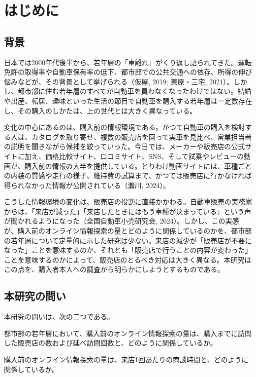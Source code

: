 \section{はじめに}

\subsection{背景}

日本では2000年代後半から、若年層の「車離れ」がくり返し語られてきた。運転免許の取得率や自動車保有率の低下、都市部での公共交通への依存、所得の伸び悩みなどが、その背景として挙げられる（仮屋, 2019; 東原・三宅, 2021）。しかし、都市部に住む若年層のすべてが自動車を買わなくなったわけではない。結婚や出産、転居、趣味といった生活の節目で自動車を購入する若年層は一定数存在し、その購入のしかたは、上の世代とは大きく異なっている。

変化の中心にあるのは、購入前の情報環境である。かつて自動車の購入を検討する人は、カタログを取り寄せ、複数の販売店を回って実車を見比べ、営業担当者の説明を聞きながら候補を絞っていった。今日では、メーカーや販売店の公式サイトに加え、価格比較サイト、口コミサイト、SNS、そして試乗やレビューの動画が、購入前の情報の大半を提供している。とりわけ動画サイトには、車種ごとの内装の質感や走行の様子、維持費の試算まで、かつては販売店に行かなければ得られなかった情報が公開されている（瀬川, 2024）。

こうした情報環境の変化は、販売店の役割に直接かかわる。自動車販売の実務家からは、「来店が減った」「来店したときにはもう車種が決まっている」という声が聞かれるようになった（全国自動車小売研究会, 2024）。しかし、この実感が、購入前のオンライン情報探索の量とどのように関係しているのかを、都市部の若年層について定量的に示した研究は少ない。来店の減少が「販売店が不要になった」ことを意味するのか、それとも「販売店で行うことの内容が変わった」ことを意味するのかによって、販売店のとるべき対応は大きく異なる。本研究はこの点を、購入者本人への調査から明らかにしようとするものである。

\subsection{本研究の問い}

本研究の問いは、次の二つである。

\begin{description}[style=nextline,leftmargin=2\zw,labelsep=0.5\zw,font=\normalfont\bfseries,itemsep=2pt]
  \item[RQ1] 都市部の若年層において、購入前のオンライン情報探索の量は、購入までに訪問した販売店の数および延べ訪問回数と、どのように関係しているか。
  \item[RQ2] 購入前のオンライン情報探索の量は、来店1回あたりの商談時間と、どのように関係しているか。
\end{description}

